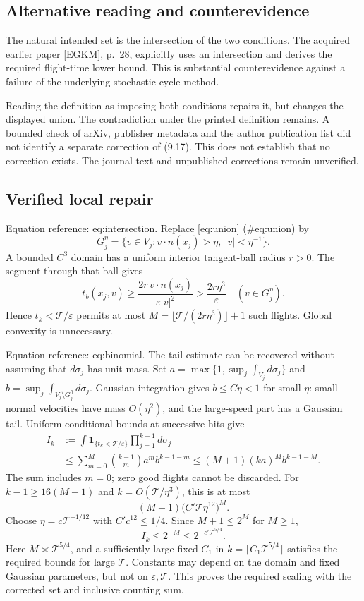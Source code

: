 \documentclass[10pt]{article}
\begin{document}
\subsection*{Alternative reading and counterevidence}
The natural intended set is the intersection of the two conditions. The acquired earlier paper [EGKM], p. 28, explicitly uses an intersection and derives the required flight-time lower bound. This is substantial counterevidence against a failure of the underlying stochastic-cycle method.\par
Reading the definition as imposing both conditions repairs it, but changes the displayed union. The contradiction under the printed definition remains. A bounded check of arXiv, publisher metadata and the author publication list did not identify a separate correction of (9.17). This does not establish that no correction exists. The journal text and unpublished corrections remain unverified.\par
\subsection*{Verified local repair}
Equation reference: eq:intersection. Replace [eq:union] (\#eq:union) by \[
 G_j^\eta=\{v\in V_j:v\cdot n(x_j)>\eta,\ |v|<\eta^{-1}\}.\] A bounded \(C^3\) domain has a uniform interior tangent-ball radius \(r>0\). The segment through that ball gives \[t_b(x_j,v)\ge
 \frac{2r\,v\cdot n(x_j)}{\varepsilon |v|^2}
 >\frac{2r\eta^3}{\varepsilon}
 \quad(v\in G_j^\eta).\] Hence \(t_k<\mathcal T/\varepsilon\) permits at most \(M=\lfloor\mathcal T/(2r\eta^3)\rfloor+1\) such flights. Global convexity is unnecessary.\par
Equation reference: eq:binomial. The tail estimate can be recovered without assuming that \(d\sigma_j\) has unit mass. Set \(a=\max\{1,\sup_j\int_{V_j}d\sigma_j\}\) and \(b=\sup_j\int_{V_j\setminus G_j^\eta}d\sigma_j\). Gaussian integration gives \(b\le C\eta<1\) for small \(\eta\): small-normal velocities have mass \(O(\eta^2)\), and the large-speed part has a Gaussian tail. Uniform conditional bounds at successive hits give \[\begin{aligned}
 I_k&:=\int\mathbf1_{\{t_k<\mathcal T/\varepsilon\}}
                       \prod_{j=1}^{k-1}d\sigma_j\\
 &\le\sum_{m=0}^{M}\binom{k-1}{m}a^m b^{k-1-m}
 \le(M+1)(ka)^M b^{k-1-M}. \end{aligned}\] The sum includes \(m=0\); zero good flights cannot be discarded. For \(k-1\ge16(M+1)\) and \(k=O(\mathcal T/\eta^3)\), this is at most \[(M+1)\bigl(C'\mathcal T\eta^{12}\bigr)^M.\] Choose \(\eta=c\mathcal T^{-1/12}\) with \(C'c^{12}\le1/4\). Since \(M+1\le2^M\) for \(M\ge1\), \[I_k\le2^{-M}\le2^{-c'\mathcal T^{5/4}}.\] Here \(M\asymp\mathcal T^{5/4}\), and a sufficiently large fixed \(C_1\) in \(k=\lceil C_1\mathcal T^{5/4}\rceil\) satisfies the required bounds for large \(\mathcal T\). Constants may depend on the domain and fixed Gaussian parameters, but not on \(\varepsilon,\mathcal T\). This proves the required scaling with the corrected set and inclusive counting sum.\par
\end{document}
